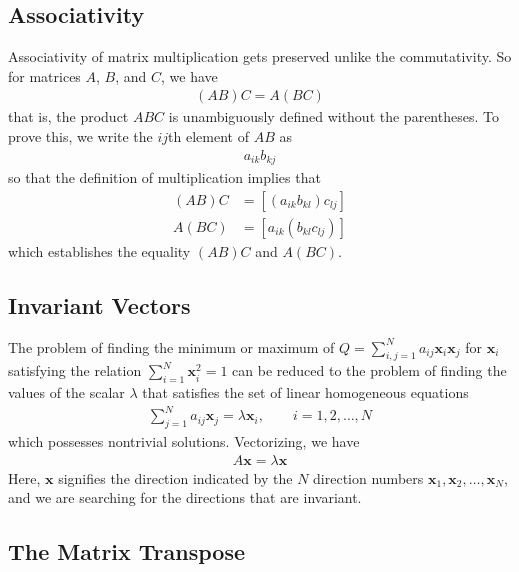 \subsection{Associativity}
Associativity of matrix multiplication gets preserved unlike the commutativity. So for matrices $A$, $B$, and $C$, we have
%
\begin{align}
	\left(AB\right)C = A\left(BC\right)
\end{align}
%
that is, the product $ABC$ is unambiguously defined without the parentheses. To prove this, we write the $ij$th element of $AB$ as 
%
\begin{align}
	a_{ik} b_{kj}
\end{align} 
%
so that the definition of multiplication implies that 
%
\begin{align}
	\left(AB\right) C &= \left[\left(a_{ik} b_{kl} \right)c_{lj}\right] \\
	A \left(BC\right) & = \left[a_{ik}\left( b_{kl} c_{lj} \right)\right]
\end{align}
%
which establishes the equality $\left(AB\right) C$ and $A \left(BC\right)$.

\subsection{Invariant Vectors}
%
The problem of finding the minimum or maximum of  $Q = \sum_{i,j=1}^{N} a_{ij} \bm{x}_i \bm{x}_j$ for $\bm{x}_i$ satisfying the relation $\sum_{i=1}^{N} \bm{x}_i^2 = 1$ can be reduced to the problem of finding the values of the scalar $\lambda$ that satisfies the set of linear homogeneous equations
%
\begin{align}
	\sum_{j=1}^{N} a_{ij} \bm{x}_j = \lambda \bm{x}_i, \qquad i=1,2,\ldots, N
\end{align}
%
which possesses nontrivial solutions. Vectorizing, we have
%
\begin{align}
	A \bm{x} = \lambda \bm{x}
\end{align}
%
Here, $\bm{x}$ signifies the direction indicated by the $N$ direction numbers $\bm{x}_1, \bm{x}_2, \ldots, \bm{x}_N$, and we are searching for the directions  that are invariant.

\subsection{The Matrix Transpose}

